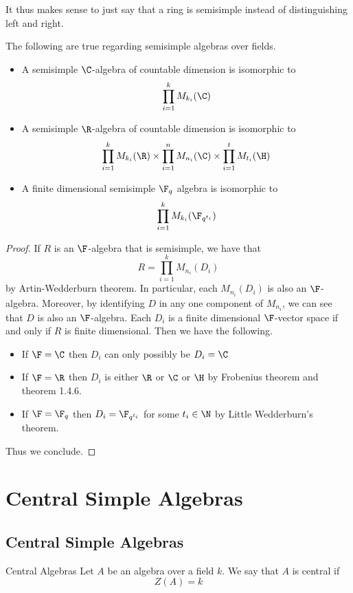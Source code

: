 \documentclass[a4paper]{article}
\begin{document}
It thus makes sense to just say that a ring is semisimple instead of distinguishing left and right. 

\begin{prp}{}{} The following are true regarding semisimple algebras over fields. 
\begin{itemize}
\item A semisimple $\C$-algebra of countable dimension is isomorphic to $$\prod_{i=1}^kM_{k_i}(\C)$$
\item A semisimple $\R$-algebra of countable dimension is isomorphic to $$\prod_{i=1}^kM_{k_i}(\R)\times\prod_{i=1}^nM_{n_i}(\C)\times\prod_{i=1}^tM_{t_i}(\H)$$
\item A finite dimensional semisimple $\F_q$ algebra is isomorphic to $$\prod_{i=1}^k M_{k_i}(\F_{q^{t_i}})$$
\end{itemize} \tcbline
\begin{proof}
If $R$ is an $\F$-algebra that is semisimple, we have that $$R=\prod_{i=1}^kM_{n_i}(D_i)$$ by Artin-Wedderburn theorem. In particular, each $M_{n_i}(D_i)$ is also an $\F$-algebra. Moreover, by identifying $D$ in any one component of $M_{n_i}$, we can see that $D$ is also an $\F$-algebra. Each $D_i$ is a finite dimensional $\F$-vector space if and only if $R$ is finite dimensional. Then we have the following. 
\begin{itemize}
\item If $\F=\C$ then $D_i$ can only possibly be $D_i=\C$
\item If $\F=\R$ then $D_i$ is either $\R$ or $\C$ or $\H$ by Frobenius theorem and theorem 1.4.6. 
\item If $\F=\F_{q}$ then $D_i=\F_{q^{t_i}}$ for some $t_i\in\N$ by Little Wedderburn's theorem. 
\end{itemize}
Thus we conclude. 
\end{proof}
\end{prp}

\pagebreak
\section{Central Simple Algebras}
\subsection{Central Simple Algebras}
\begin{defn}{Central Algebras}{} Let $A$ be an algebra over a field $k$. We say that $A$ is central if $$Z(A)=k$$
\end{defn}
\end{document}
